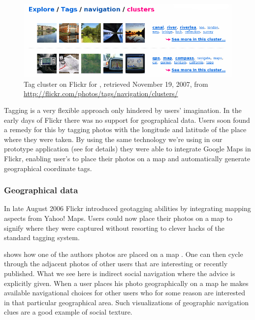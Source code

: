 \begin{figure}
  \begin{whole}
    \includegraphics[width=\wholewidth]{scrsh_flickr_tagcluster}
    \caption[Flickr Tag Cluster]{%
       Tag cluster on Flickr for ,
       retrieved November 19, 2007, from
       \url{http://flickr.com/photos/tags/navigation/clusters/}}
    \label{figure:scrsh.flickr.tagcluster}
  \end{whole}
\end{figure}

Tagging is a very flexible approach only hindered by users' imagination. In
the early days of Flickr there was no support for geographical data. Users
soon found a remedy for this by tagging photos with the longitude and
latitude of the place where they were taken.
By using the same technology we're using in our prototype
application (see  for details)
they were able to integrate Google Maps%
 in Flickr, enabling user's to place their photos on a map and automatically
generate geographical coordinate tags.%

\subsubsection{Geographical data}

In late August 2006 Flickr introduced geotagging abilities
\citep{butterfield06a} by integrating mapping aspects from Yahoo! Maps.%
Users could now place their photos on a
map to signify where they were captured without resorting to clever hacks of
the standard tagging system.

 shows how one of the authors photos are
placed on a map .
One can then cycle through the adjacent photos of other users
that are interesting or recently published.
What we see here is indirect social navigation where the advice is explicitly
given. When a user places his photo geographically on a map he makes available
navigational choices for other users who for some reason are interested in
that particular geographical area. Such visualizations of geographic
navigation clues are a good example of social texture.


